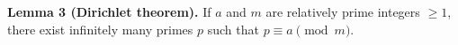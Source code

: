 \textbf{Lemma 3 (Dirichlet theorem).} If $a$ and $m$ are relatively prime integers $\geq 1$, there exist infinitely many primes $p$ such that $p \equiv a \pmod{m}$.
